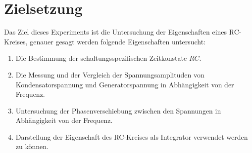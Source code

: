\section{Zielsetzung}
\label{sec:Zielsetzung}


Das Ziel dieses Experiments ist die Untersuchung der Eigenschaften eines RC-Kreises, genauer gesagt werden folgende Eigenschaften untersucht:
\begin{enumerate}[label=\alph*)]
    \item Die Bestimmung der schaltungsspezifischen Zeitkonstate $RC$.
    \item Die Messung und der Vergleich der Spannungsamplituden von Kondensatorspannung und Generatorspannung in Abhängigkeit von der Frequenz.
    \item Untersuchung der Phasenverschiebung zwischen den Spannungen in Abhängigkeit von der Frequenz.
    \item Darstellung der Eigenschaft des RC-Kreises als Integrator verwendet werden zu können.
\end{enumerate}